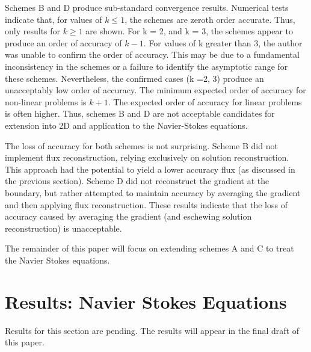 \noindent Schemes B and D produce sub-standard convergence results. Numerical tests indicate that, for values of $k \leq 1$, the schemes are zeroth order accurate. Thus, only results for $k \geq 1$ are shown. For k = 2, and k = 3, the schemes appear to produce an order of accuracy of $k-1$. For values of k greater than 3, the author was unable to confirm the order of accuracy. This may be due to a fundamental inconsistency in the schemes or a failure to identify the asymptotic range for these schemes. Nevertheless, the confirmed cases (k =2, 3) produce an unacceptably low order of accuracy. The minimum expected order of accuracy for non-linear problems is $k+1$. The expected order of accuracy for linear problems is often higher. Thus, schemes B and D are not acceptable candidates for extension into 2D and application to the Navier-Stokes equations. 

\vspace{0.1in}

\noindent The loss of accuracy for both schemes is not surprising. Scheme B did not implement flux reconstruction, relying exclusively on solution reconstruction. This approach had the potential to yield a lower accuracy flux (as discussed in the previous section). Scheme D did not reconstruct the gradient at the boundary, but rather attempted to maintain accuracy by averaging the gradient and then applying flux reconstruction. These results indicate that the loss of accuracy caused by averaging the gradient (and eschewing solution reconstruction) is unacceptable.

\vspace{0.1in}
\noindent The remainder of this paper will focus on extending schemes A and C to treat the Navier Stokes equations.

 

\vspace{0.2 in}
\section{Results: Navier Stokes Equations}
\noindent Results for this section are pending. The results will appear in the final draft of this paper.
\vspace{0.2 in}